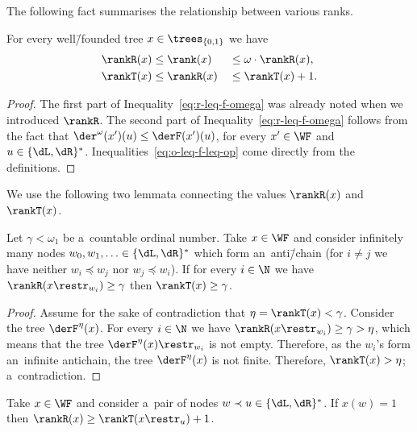 \documentclass{lmcs}
\numberwithin{equation}{section}
\numberwithin{figure}{section}
\begin{document}
The following fact summarises the relationship between various ranks.

\begin{fact}\label{ft:monotone}
	For every well\=/founded tree $x\in\trees_{\{0,1\}}$ we have
	\begin{alignat}{4}
	\rankR(x) &\leq \rank(x) &&\leq\omega\cdot \rankR(x),\label{eq:r-leq-f-omega}\\
	\rankT(x) &\leq \rankR(x) &&\leq\rankT(x)+1.\label{eq:o-leq-f-leq-op}
	\end{alignat}
\end{fact}

\begin{proof}
	The first part of Inequality~\eqref{eq:r-leq-f-omega} was already noted when we introduced $\rankR$.
	The second part of Inequality~\eqref{eq:r-leq-f-omega} follows from the fact that $\der^\omega(x')(u) \leq \derF(x')(u)$, for every $x'\in\WF$ and $u\in\{\dL,\dR\}^\ast$.
	Inequalities~\eqref{eq:o-leq-f-leq-op} come directly from the definitions.
\end{proof}

We use the following two lemmata connecting the values $\rankR(x)$ and $\rankT(x)$.

\begin{lem}\label{lem:inf-fank-to-oank}
	Let $\gamma<\omega_1$ be a~countable ordinal number.
	Take $x\in\WF$ and consider infinitely many nodes $w_0,w_1,\ldots\in\{\dL,\dR\}^\ast$ which form an~anti\=/chain (for $i\neq j$ we have neither $w_i\preceq w_j$ nor $w_j\preceq w_i$).
	If for every $i\in\N$ we have $\rankR(x\restr_{w_i})\geq \gamma$ then $\rankT(x)\geq\gamma$.
\end{lem}

\begin{proof}
	Assume for the sake of contradiction that $\eta=\rankT(x)<\gamma$.
	Consider the tree $\derF^\eta(x)$.
	For every $i\in\N$ we have $\rankR(x\restr_{w_i})\geq\gamma>\eta$, which means that the tree $\derF^\eta(x)\restr_{w_i}$ is not empty.
	Therefore, as the $w_i$'s form an~infinite antichain, the tree $\derF^\eta(x)$ is not finite.
	Therefore, $\rankT(x)>\eta$; a~contradiction.
\end{proof}

\begin{lem}\label{lem:fin-oank-to-fank}
	Take $x\in\WF$ and consider a~pair of nodes $w\prec u\in\{\dL,\dR\}^\ast$.
	If $x(w)=1$ then $\rankR(x)\geq \rankT(x\restr_u)+1$.
\end{lem}
\end{document}
